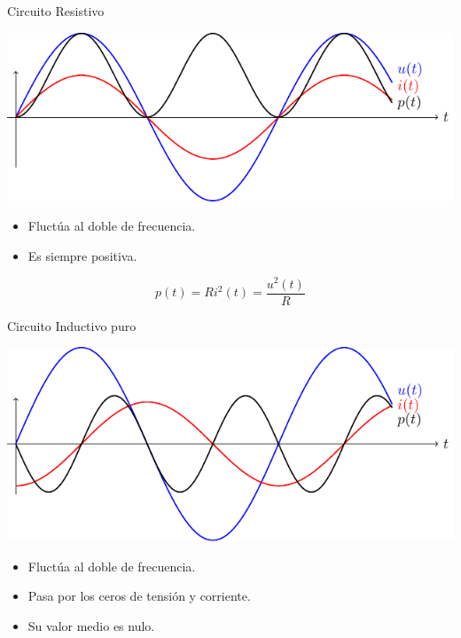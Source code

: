 \documentclass[xcolor={usenames,svgnames,dvipsnames}]{beamer}
\begin{document}
\begin{frame}[label={sec:org7742138}]{Circuito Resistivo}
\begin{center}
\includegraphics[width=.9\linewidth]{../figs/resistivoPotencia.pdf}
\end{center}

\begin{itemize}
\item Fluctúa al doble de frecuencia.
\item Es siempre positiva.
\end{itemize}
\[
  p(t) = R i^2(t) = \frac{u^2(t)}{R}
\]
\end{frame}
\begin{frame}[label={sec:org37be867}]{Circuito Inductivo puro}
\begin{center}
\includegraphics[width=.9\linewidth]{../figs/inductivoPuroPotencia.pdf}
\end{center}

\begin{itemize}
\item Fluctúa al doble de frecuencia.
\item Pasa por los ceros de tensión y corriente.
\item Su valor medio es nulo.
\end{itemize}
\end{frame}
\end{document}
